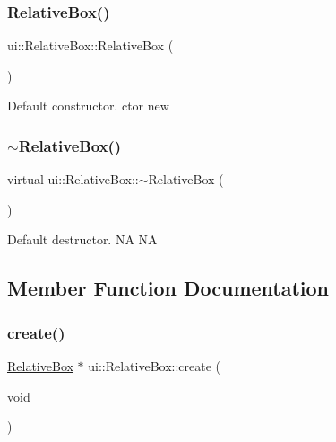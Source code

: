 \subsubsection{\texorpdfstring{Relative\+Box()}{RelativeBox()}\hspace{0.1cm}{\footnotesize\ttfamily [2/2]}}
{\footnotesize\ttfamily ui\+::\+Relative\+Box\+::\+Relative\+Box (\begin{DoxyParamCaption}{ }\end{DoxyParamCaption})}

Default constructor.  ctor  new \mbox{\label{classui_1_1RelativeBox_aa707cb7604dcc542665d6ecc116df511}} 
\subsubsection{\texorpdfstring{$\sim$\+Relative\+Box()}{~RelativeBox()}\hspace{0.1cm}{\footnotesize\ttfamily [2/2]}}
{\footnotesize\ttfamily virtual ui\+::\+Relative\+Box\+::$\sim$\+Relative\+Box (\begin{DoxyParamCaption}{ }\end{DoxyParamCaption})\hspace{0.3cm}{\ttfamily [virtual]}}

Default destructor.  NA  NA 

\subsection{Member Function Documentation}
\mbox{\label{classui_1_1RelativeBox_a1b24d37fcf9825a5fea2057f346f2e95}} 
\subsubsection{\texorpdfstring{create()}{create()}\hspace{0.1cm}{\footnotesize\ttfamily [1/4]}}
{\footnotesize\ttfamily \hyperlink{classui_1_1RelativeBox}{Relative\+Box} $\ast$ ui\+::\+Relative\+Box\+::create (\begin{DoxyParamCaption}\item[{void}]{ }\end{DoxyParamCaption})\hspace{0.3cm}{\ttfamily [static]}}

